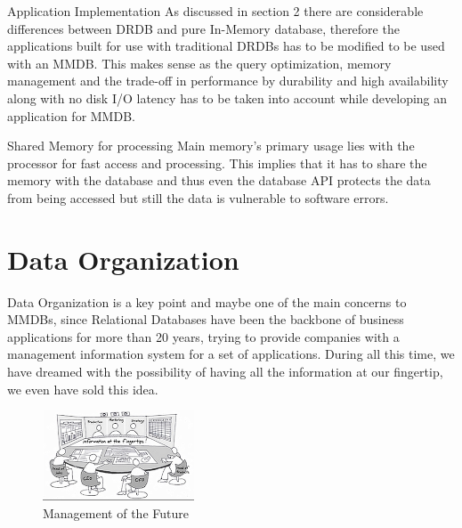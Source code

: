 \documentclass[12pt]{article} %
\begin{document}
\begin{description}
\item {Application Implementation}
As discussed in section 2 there are considerable differences between DRDB and pure In-Memory database, therefore the applications built for use with traditional DRDBs has to be modified to be used with an MMDB. This makes sense as the query optimization, memory management and the trade-off in performance by durability and high availability along with no disk I/O latency has to be taken into account while developing an application for MMDB. 

\item {Shared Memory for processing}
Main memory's primary usage lies with the processor for fast access and processing. This implies that it has to share the memory with the database and thus even the database API protects the data from being accessed but still the data is vulnerable to software errors. 

\end{description}





\section{Data Organization}

Data Organization is a key point and maybe one of the main concerns to MMDBs, since Relational Databases have been the backbone of business applications for more  than 20 years, trying to provide companies with a management information system for a set of applications. During all this time, we have dreamed with the possibility of having all the information at our fingertip, we even have sold this idea\cite{Plattner}.

\begin{figure}
  \begin{center}
    \includegraphics[width=0.4\textwidth]{./pictures/fig5}
  \end{center}
  \caption{Management of the Future}
  \label{fig:fig5}
\end{figure}
\end{document}
